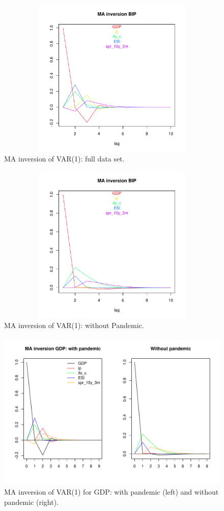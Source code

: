 \documentclass[a4paper]{article}
\begin{document}
\begin{figure}[H]\begin{center}\includegraphics[height=3in, width=4.5in]{./Figures/ma_inv_multi_ip.pdf}\caption{MA inversion of VAR(1): full data set.\label{impulse}}\end{center}\end{figure}\begin{figure}[H]\begin{center}\includegraphics[height=3in, width=4.5in]{./Figures/ma_inv_multi_ip_wc.pdf}\caption{MA inversion of VAR(1): without Pandemic.\label{impulse_wc}}\end{center}\end{figure}\begin{figure}[H]\begin{center}\includegraphics[height=3in, width=6in]{./Figures/ma_inv_BIP.pdf}\caption{MA inversion of VAR(1) for GDP: with pandemic (left) and without pandemic (right).\label{ma_inv_BIP}}\end{center}\end{figure}
\end{document}
